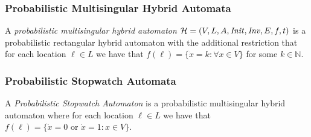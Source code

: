 \subsubsection{Probabilistic Multisingular Hybrid Automata}
\begin{defi}
A \emph{probabilistic multisingular hybrid automaton} $\mathcal{H}=(V,L,A,\mathit{Init},\mathit{Inv},E,f,t)$ is a probabilistic rectangular hybrid automaton with the additional restriction that for each location $\ell\in L$ we have that $f(\ell)=\{\dot{x}=k : \forall x\in V\}$ for some $k\in\mathbb{N}$.
\end{defi}


\subsubsection{Probabilistic Stopwatch Automata}
\begin{defi}
A \emph{Probabilistic Stopwatch Automaton} is a probabilistic multisingular hybrid automaton where for each location $\ell\in L$ we have that $f(\ell)=\{\dot{x}=0 \text{ or } \dot{x}=1 : x\in V\}$.
\end{defi}


